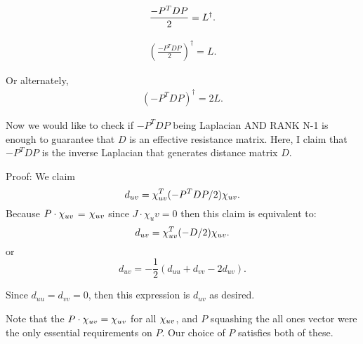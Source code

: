 \begin{align}
\frac{-P^T D P}{2} = L^{\dag}.
\end{align}

\begin{align}
\left(\frac{-P^T D P}{2}\right)^\dag = L.
\end{align}

Or alternately, 
\begin{align}
\left(-P^T D P \right)^\dag = 2L.
\end{align}

Now we would like to check if $-P^T D P$ being Laplacian AND RANK N-1 is enough to
guarantee that $D$ is an effective resistance matrix. Here, I claim that
$-P^TDP$ is the inverse Laplacian that generates distance matrix $D$.

Proof: We claim 
\[ d_{uv} = \chi_{uv}^T (-P^TDP/2) \chi_{uv}. \]
Because $P \cdot \chi_{uv}$ = $\chi_{uv}$ since $J \cdot \chi_uv = 0$ then this claim is equivalent to:
\[ d_{uv} = \chi_{uv}^T (-D/2) \chi_{uv}. \]
or
\[ d_{uv} = -\frac{1}{2}(d_{uu} + d_{vv} - 2d_{uv}). \]

Since $d_{uu} = d_{vv} = 0$, then this expression is $d_{uv}$ as desired.

Note that the $P \cdot \chi_{uv} = \chi_{uv}$ for all $\chi_{uv}$,
and $P$ squashing the all ones vector were
the only essential requirements on $P$. Our choice of $P$
satisfies both of these.


